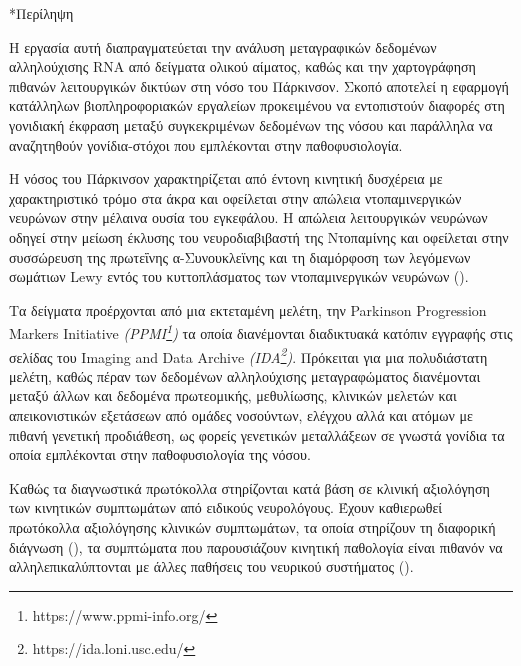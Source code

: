 \documentclass[12pt]{report}
\makeatletter
\let\oldchapter\chapter
\renewcommand{\chapter}{\@ifstar{\starchapter}{\nostarchapter}}
\newcommand{\starchapter}[1]{\oldchapter*{#1}\thispagestyle{mainstyle}}
\newcommand{\nostarchapter}[1]{\oldchapter{#1}\thispagestyle{mainstyle}}
\let\oldfootnote\footnote
\renewcommand{\footnote}[1]{\oldfootnote{\onehalfspacing #1}}
\makeatother
\begin{document}
\cleardoublepage
\pagestyle{mainstyle}

\chapter*{Περίληψη}
    \par
        H εργασία αυτή διαπραγματεύεται την ανάλυση μεταγραφικών δεδομένων αλληλούχισης RNA από δείγματα ολικού αίματος, καθώς και την χαρτογράφηση πιθανών λειτουργικών δικτύων στη νόσο του Πάρκινσον. Σκοπό αποτελεί η εφαρμογή κατάλληλων βιοπληροφοριακών εργαλείων προκειμένου να εντοπιστούν διαφορές στη γονιδιακή έκφραση μεταξύ συγκεκριμένων δεδομένων της νόσου και παράλληλα να αναζητηθούν γονίδια-στόχοι που εμπλέκονται στην παθοφυσιολογία.
    \par
        Η νόσος του Πάρκινσον χαρακτηρίζεται από έντονη κινητική δυσχέρεια με χαρακτηριστικό τρόμο στα άκρα και οφείλεται στην απώλεια ντοπαμινεργικών νευρώνων στην μέλαινα ουσία του εγκεφάλου. Η απώλεια λειτουργικών νευρώνων οδηγεί στην μείωση έκλυσης του νευροδιαβιβαστή της Ντοπαμίνης και οφείλεται στην συσσώρευση της πρωτεΐνης α-Συνουκλεϊνης και τη διαμόρφοση των λεγόμενων σωμάτιων Lewy εντός του κυττοπλάσματος των ντοπαμινεργικών νευρώνων (\emph{\cite{Balestrino2020ParkinsonDisease}}).
    \par
        Τα δείγματα προέρχονται από μια εκτεταμένη μελέτη, την Parkinson Progression Markers Initiative \emph{(PPMI\footnote{https://www.ppmi-info.org/})} τα οποία διανέμονται διαδικτυακά κατόπιν εγγραφής στις σελίδας του Imaging and Data Archive \emph{(IDA\footnote{https://ida.loni.usc.edu/})}. Πρόκειται για μια πολυδιάστατη μελέτη, καθώς πέραν των δεδομένων αλληλούχισης μεταγραφώματος διανέμονται μεταξύ άλλων και δεδομένα πρωτεομικής, μεθυλίωσης, κλινικών μελετών και απεικονιστικών εξετάσεων από ομάδες νοσούντων, ελέγχου αλλά και ατόμων με πιθανή γενετική προδιάθεση, ως φορείς γενετικών μεταλλάξεων σε γνωστά γονίδια τα οποία εμπλέκονται στην παθοφυσιολογία της νόσου.
    \par
        Καθώς τα διαγνωστικά πρωτόκολλα στηρίζονται κατά βάση σε κλινική αξιολόγηση των κινητικών συμπτωμάτων από ειδικούς νευρολόγους. Έχουν καθιερωθεί πρωτόκολλα αξιολόγησης κλινικών συμπτωμάτων, τα οποία στηρίζουν τη διαφορική διάγνωση (\emph{\cite{Koller2018TableGuidelines}}), τα συμπτώματα που παρουσιάζουν κινητική παθολογία είναι πιθανόν να αλληλεπικαλύπτονται με άλλες παθήσεις του νευρικού συστήματος (\emph{\cite{Tolosa2021ChallengesDisease}}). 
    \par
\end{document}
